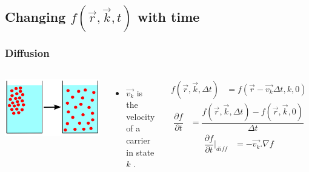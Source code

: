 \documentclass{beamer}
\begin{document}
\subsection{Changing $f (\vec{r},\vec{k},t)$ with time}
\begin{frame}
\frametitle{Diffusion}
\begin{columns}
\pause
\includegraphics[scale=.1]{diffusion}
\begin{itemize}
\pause
\item $\vec{v_k}$ is the velocity of a carrier in state $k$ .
\end{itemize}
\pause
\begin{align*}
f (\vec{r},\vec{k},\Delta t) &= f (\vec{r}-\vec{v_k} \Delta t,k ,0) 
\end{align*}
\pause
\begin{align*}
\dfrac{\partial f}{\partial t} &= \dfrac{f (\vec{r},\vec{k},\Delta t) - f (\vec{r},\vec{k},0)}{\Delta t}  
\end{align*}
\pause
\begin{align*}
\dfrac{\partial f}{\partial t}\big| _{diff} &= -\vec{v_k} .\nabla f
\end{align*}
\end{columns}
\end{frame}
\end{document}

